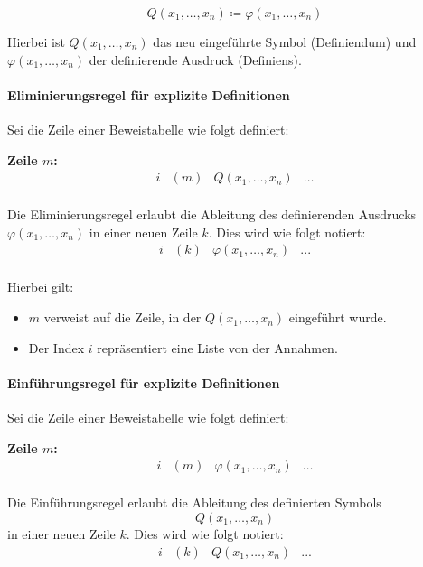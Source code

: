 \documentclass[main.tex]{subfiles}
\begin{document}
\begin{definition}[\(Q\) (explizit)]
\[
Q(x_1,\dots,x_n) \coloneqq \varphi(x_1,\dots,x_n)
\]    
\end{definition}

Hierbei ist \(Q(x_1,\dots,x_n)\) das neu eingeführte Symbol (Definiendum) und \(\varphi(x_1,\dots,x_n)\) der definierende Ausdruck (Definiens).

\paragraph{Eliminierungsregel für explizite Definitionen}
Sei die Zeile einer Beweistabelle wie folgt definiert:

\textbf{Zeile \(m\):}
\[
\begin{array}{llll}
   i & (m) & Q(x_1,\dots,x_n) & \dots \\
\end{array}
\]

Die Eliminierungsregel erlaubt die Ableitung des definierenden Ausdrucks \(\varphi(x_1,\dots,x_n)\) in einer neuen Zeile \(k\). Dies wird wie folgt notiert:
\[
\begin{array}{llll}
   i& (k) & \varphi(x_1,\dots,x_n) & ... \\
\end{array}
\]

Hierbei gilt:
\begin{itemize}
    \item \(m\) verweist auf die Zeile, in der \(Q(x_1,\dots,x_n)\) eingeführt wurde.
    \item Der Index \(i\) repräsentiert eine Liste von der Annahmen.
\end{itemize}

\paragraph{Einführungsregel für explizite Definitionen}
Sei die Zeile einer Beweistabelle wie folgt definiert:

\textbf{Zeile \(m\):}
\[
\begin{array}{llll}
   i& (m) & \varphi(x_1,\dots,x_n) & \dots \\
\end{array}
\]

Die Einführungsregel erlaubt die Ableitung des definierten Symbols 
\[
Q(x_1,\dots,x_n)
\] 
in einer neuen Zeile \(k\). Dies wird wie folgt notiert:
\[
\begin{array}{llll}
   i& (k) & Q(x_1,\dots,x_n) & ... \\
\end{array}
\]
\end{document}
